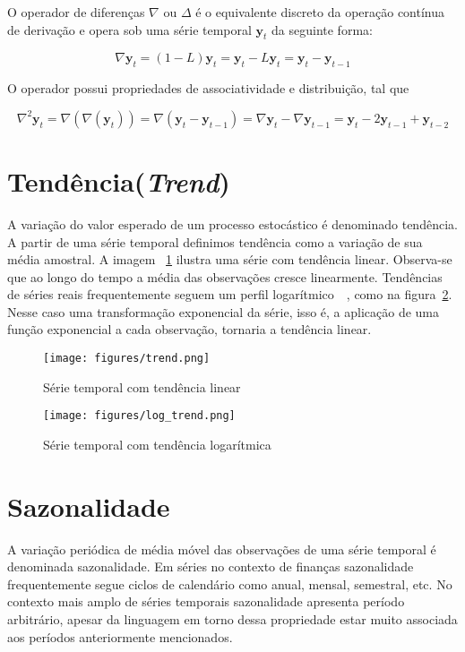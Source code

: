 O operador de diferenças $\nabla$ ou  $\Delta$ é o equivalente discreto da
operação contínua de derivação e opera sob uma série temporal
$\mathbf{y}_t$ da seguinte forma:

$$ \nabla \mathbf{y}_t = (1 - L)\mathbf{y}_t = \mathbf{y}_t - L\mathbf{y}_t = \mathbf{y}_t - \mathbf{y}_{t-1} $$

O operador possui propriedades de associatividade e distribuição, tal que

$$ \nabla^2 \mathbf{y}_t = \nabla(\nabla(\mathbf{y}_t)) = \nabla(\mathbf{y}_t - \mathbf{y}_{t-1}) = \nabla \mathbf{y}_t - \nabla \mathbf{y}_{t-1} = \mathbf{y}_t - 2 \mathbf{y}_{t-1} + \mathbf{y}_{t-2} $$

\section{Tendência(\emph{Trend})}

A variação do valor esperado de um processo estocástico é denominado tendência.
A partir de uma série temporal definimos tendência como a variação de sua média
amostral. A imagem ~\ref{fig:trend} ilustra uma série com tendência linear.
Observa-se que ao longo do tempo a média das observações cresce linearmente.
Tendências de séries reais frequentemente seguem um perfil
logarítmico~~\cite{chatfield}, como na figura~\ref{fig:log_trend}. Nesse caso
uma transformação exponencial da série, isso é, a aplicação de uma função
exponencial a cada observação, tornaria a tendência linear.

\begin{figure}[H]
    \centering
    \texttt{[image: figures/trend.png]}
    \caption{Série temporal com tendência linear}
    \label{fig:trend}
\end{figure}

\begin{figure}[H]
    \centering
    \texttt{[image: figures/log\_trend.png]}
    \caption{Série temporal com tendência logarítmica}
    \label{fig:log_trend}
\end{figure}

\section{Sazonalidade}\label{sec:seasonality}

A variação periódica de média móvel das observações de uma série temporal é
denominada sazonalidade. Em séries no contexto de finanças sazonalidade
frequentemente segue ciclos de calendário como anual, mensal, semestral, etc.
No contexto mais amplo de séries temporais sazonalidade apresenta período
arbitrário, apesar da linguagem em torno dessa propriedade estar muito
associada aos períodos anteriormente mencionados.

